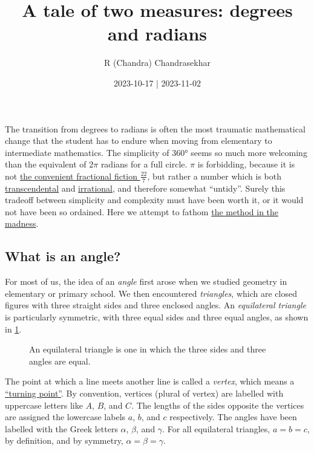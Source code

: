 \documentclass[
  a4paper,
]{article}
\title{A tale of two measures: degrees and radians}
\author{R (Chandra) Chandrasekhar}
\date{2023-10-17 | 2023-11-02}
\begin{document}
\maketitle

\thispagestyle{empty}


The transition from degrees to radians is often the most traumatic
mathematical change that the student has to endure when moving from
elementary to intermediate mathematics. The simplicity of 360° seems so
much more welcoming than the equivalent of \(2\pi\) radians for a full
circle. \(\pi\) is forbidding, because it is not
\href{https://en.wikipedia.org/wiki/Proof_that_22/7_exceeds_\%CF\%80}{the
convenient fractional fiction \(\frac{22}{7}\)}, but rather a number
which is both
\href{https://mathworld.wolfram.com/TranscendentalNumber.html}{transcendental}
and \href{https://en.wikipedia.org/wiki/Irrational_number}{irrational},
and therefore somewhat ``untidy''. Surely this tradeoff between
simplicity and complexity must have been worth it, or it would not have
been so ordained. Here we attempt to fathom
\href{https://grammarist.com/phrase/a-method-in-ones-madness/}{the
method in the madness}.

\hypertarget{what-is-an-angle}{%
\subsection{What is an angle?}\label{what-is-an-angle}}

For most of us, the idea of an \emph{angle} first arose when we studied
geometry in elementary or primary school. We then encountered
\emph{triangles}, which are closed figures with three straight sides and
three enclosed angles. An \emph{equilateral triangle} is particularly
symmetric, with three equal sides and three equal angles, as shown in
\cref{fig:equilateral}.

\begin{figure}
\hypertarget{fig:equilateral}{%
\centering

\caption{An equilateral triangle is one in which the three sides and
three angles are equal.}\label{fig:equilateral}
}
\end{figure}

The point at which a line meets another line is called a \emph{vertex},
which means a
\href{https://www.etymonline.com/search?q=vertex}{``turning point''}. By
convention, vertices (plural of vertex) are labelled with uppercase
letters like \(A\), \(B\), and \(C\). The lengths of the sides opposite
the vertices are assigned the lowercase labels \(a\), \(b\), and \(c\)
respectively. The angles have been labelled with the Greek letters
\(\alpha\), \(\beta\), and \(\gamma\). For all equilateral triangles,
\(a = b = c\), by definition, and by symmetry,
\(\alpha = \beta = \gamma\).
\end{document}
